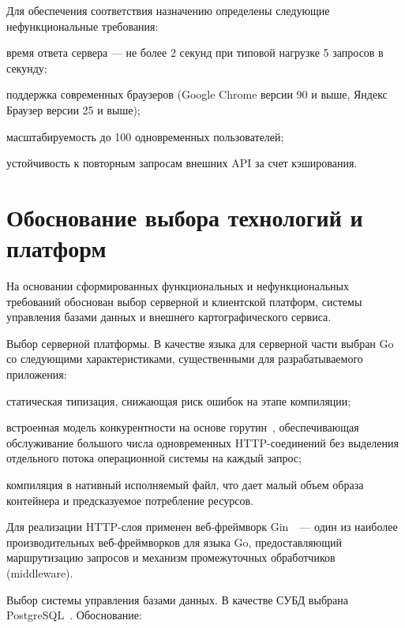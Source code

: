 Для обеспечения соответствия назначению определены следующие нефункциональные требования:

\begin{compactlist}
  \item время ответа сервера — не более 2 секунд при типовой нагрузке 5 запросов в секунду;
  \item поддержка современных браузеров (Google Chrome версии 90 и выше, Яндекс Браузер версии 25 и выше);
  \item масштабируемость до 100 одновременных пользователей;
  \item устойчивость к повторным запросам внешних API за счет кэширования.
\end{compactlist}

\section{Обоснование выбора технологий и платформ}

На основании сформированных функциональных и нефункциональных требований
обоснован выбор серверной и клиентской платформ, системы управления базами
данных и внешнего картографического сервиса.

Выбор серверной платформы. В качестве языка для серверной части выбран Go~\cite{golang}
со следующими характеристиками, существенными для разрабатываемого приложения:

\begin{compactlist}
  \item статическая типизация, снижающая риск ошибок на этапе компиляции;
  \item встроенная модель конкурентности на основе горутин~\cite{saioc2023goroutine},
        обеспечивающая обслуживание большого числа одновременных HTTP-соединений
        без выделения отдельного потока операционной системы на каждый запрос;
  \item компиляция в нативный исполняемый файл, что дает малый объем образа
        контейнера и предсказуемое потребление ресурсов.
\end{compactlist}

Для реализации HTTP-слоя применен веб-фреймворк Gin~\cite{gin}~--- один из
наиболее производительных веб-фреймворков для языка Go, предоставляющий
маршрутизацию запросов и механизм промежуточных обработчиков (middleware).

Выбор системы управления базами данных. В качестве СУБД выбрана PostgreSQL~\cite{PostgreSQL}.
Обоснование:

